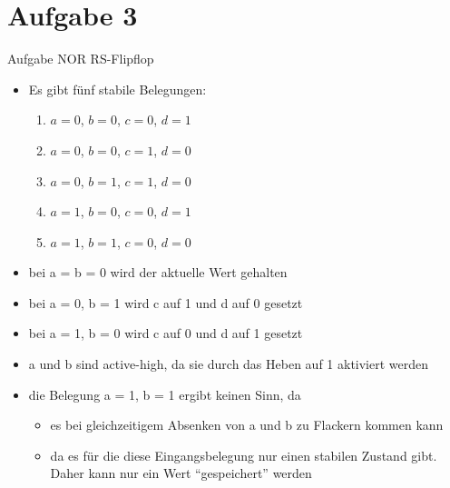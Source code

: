 
\section{Aufgabe 3}

\setcounter{exercise}{1}

\begin{frame}[allowframebreaks]{Aufgabe \thesection}{NOR RS-Flipflop}
  \begin{solution}
    \begin{itemize}
      \item Es gibt \alert{fünf stabile Belegungen}:
      \begin{enumerate}
        \item $a = 0$, $b = 0$, $c = 0$, $d = 1$
        \item $a = 0$, $b = 0$, $c = 1$, $d = 0$
        \item $a = 0$, $b = 1$, $c = 1$, $d = 0$
        \item $a = 1$, $b = 0$, $c = 0$, $d = 1$
        \item $a = 1$, $b = 1$, $c = 0$, $d = 0$
      \end{enumerate}
    \end{itemize}
  \end{solution}
  \begin{solution}
    \begin{itemize}
      \item bei a = b = 0 wird der aktuelle \alert{Wert gehalten}
      \item bei a = 0, b = 1 wird c auf 1 und d auf 0 gesetzt 
      \item bei a = 1, b = 0 wird c auf 0 und d auf 1 gesetzt
    \end{itemize}
  \end{solution}
  \begin{solution}
    \begin{itemize}
      \item a und b sind \alert{active-high}, da sie durch das Heben auf 1 aktiviert werden
    \end{itemize}
  \end{solution}
  \begin{solution}
    \begin{itemize}
      \item die Belegung a = 1, b = 1 ergibt keinen Sinn, da 
      \begin{itemize}
        \item es bei gleichzeitigem Absenken von a und b zu \alert{Flackern} kommen kann
        \item da es für die diese Eingangsbelegung \alert{nur einen stabilen Zustand} gibt. Daher kann \alert{nur ein Wert \enquote{gespeichert}} werden
      \end{itemize}
    \end{itemize}
  \end{solution}
\end{frame}
